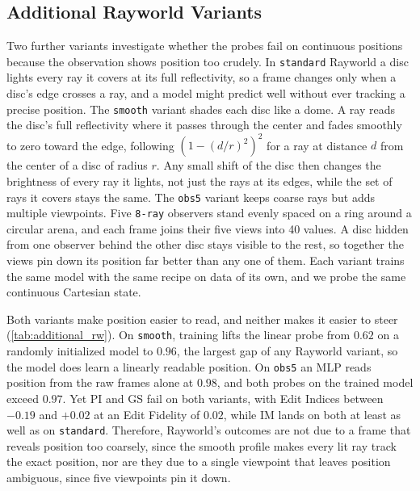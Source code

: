 \documentclass{article} %
\begin{document}
\FloatBarrier
\subsection{Additional Rayworld Variants}
\label{app:additional_rayworld_runs}

Two further variants investigate whether the probes fail on continuous positions because the observation shows position too crudely. In \texttt{standard} Rayworld a disc lights every ray it covers at its full reflectivity, so a frame changes only when a disc's edge crosses a ray, and a model might predict well without ever tracking a precise position. The \texttt{smooth} variant shades each disc like a dome. A ray reads the disc's full reflectivity where it passes through the center and fades smoothly to zero toward the edge, following $(1 - (d/r)^2)^2$ for a ray at distance $d$ from the center of a disc of radius $r$. Any small shift of the disc then changes the brightness of every ray it lights, not just the rays at its edges, while the set of rays it covers stays the same. The \texttt{obs5} variant keeps coarse rays but adds multiple viewpoints. Five \texttt{8-ray} observers stand evenly spaced on a ring around a circular arena, and each frame joins their five views into 40 values. A disc hidden from one observer behind the other disc stays visible to the rest, so together the views pin down its position far better than any one of them. Each variant trains the same model with the same recipe on data of its own, and we probe the same continuous Cartesian state.

Both variants make position easier to read, and neither makes it easier to steer (\cref{tab:additional_rw}). On \texttt{smooth}, training lifts the linear probe from $0.62$ on a randomly initialized model to $0.96$, the largest gap of any Rayworld variant, so the model does learn a linearly readable position. On \texttt{obs5} an MLP reads position from the raw frames alone at $0.98$, and both probes on the trained model exceed $0.97$. Yet PI and GS fail on both variants, with Edit Indices between $-0.19$ and $+0.02$ at an Edit Fidelity of $0.02$, while IM lands on both at least as well as on \texttt{standard}. Therefore, Rayworld's outcomes are not due to a frame that reveals position too coarsely, since the smooth profile makes every lit ray track the exact position, nor are they due to a single viewpoint that leaves position ambiguous, since five viewpoints pin it down.
\end{document}
